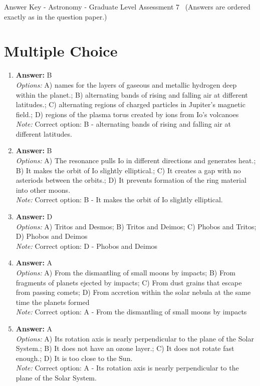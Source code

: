 \documentclass[12pt]{article}
\begin{document}
\begin{center}
Answer Key - Astronomy - Graduate Level Assessment 7 \
\small (Answers are ordered exactly as in the question paper.)
\end{center}

\section*{Multiple Choice}
\begin{enumerate}[label=\arabic*.]
\item \textbf{Answer:} B
\\ \textit{Options:} A) names for the layers of gaseous and metallic hydrogen deep within the planet.; B) alternating bands of rising and falling air at different latitudes.; C) alternating regions of charged particles in Jupiter's magnetic field.; D) regions of the plasma torus created by ions from Io's volcanoes
\\ \textit{Note:} Correct option: B - alternating bands of rising and falling air at different latitudes.
\item \textbf{Answer:} B
\\ \textit{Options:} A) The resonance pulls Io in different directions and generates heat.; B) It makes the orbit of Io slightly elliptical.; C) It creates a gap with no asteriods between the orbits.; D) It prevents formation of the ring material into other moons.
\\ \textit{Note:} Correct option: B - It makes the orbit of Io slightly elliptical.
\item \textbf{Answer:} D
\\ \textit{Options:} A) Tritos and Desmos; B) Tritos and Deimos; C) Phobos and Tritos; D) Phobos and Deimos
\\ \textit{Note:} Correct option: D - Phobos and Deimos
\item \textbf{Answer:} A
\\ \textit{Options:} A) From the dismantling of small moons by impacts; B) From fragments of planets ejected by impacts; C) From dust grains that escape from passing comets; D) From accretion within the solar nebula at the same time the planets formed
\\ \textit{Note:} Correct option: A - From the dismantling of small moons by impacts
\item \textbf{Answer:} A
\\ \textit{Options:} A) Its rotation axis is nearly perpendicular to the plane of the Solar System.; B) It does not have an ozone layer.; C) It does not rotate fast enough.; D) It is too close to the Sun.
\\ \textit{Note:} Correct option: A - Its rotation axis is nearly perpendicular to the plane of the Solar System.
\end{enumerate}
\end{document}
